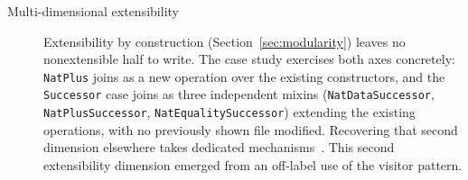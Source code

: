 \begin{CJK*}{UTF8}{gbsn}
\begin{description}
  \item[Multi-dimensional extensibility]\label{item:multi-dimensional-extensibility}
    Extensibility by construction (Section~\ref{sec:modularity}) leaves no
    nonextensible half to write.
    The case study exercises both axes concretely:
    \texttt{NatPlus} joins as a new operation over the
    existing constructors, and the \texttt{Successor} case
    joins as three independent mixins
    (\texttt{NatDataSuccessor},
    \texttt{NatPlusSuccessor},
    \texttt{NatEqualitySuccessor}) extending the existing
    operations, with no previously shown file modified.
    Recovering that second dimension elsewhere takes dedicated
    mechanisms~\cite{liang1995-monad-transformers, lammel2003-scrap-your-boilerplate, loh2006-open-data-types, swierstra2008-data-types-a-la-carte, carette2009-finally-tagless, oliveira2012-object-algebras, kiselyov2013-extensible-effects, wu2014-effect-handlers-in-scope, kiselyov2015-freer-monads, wang2016-expression-problem-trivially, leijen2017-row-typed-algebraic-effects, poulsen2023-hefty-algebras}.
    This second extensibility dimension emerged from an off-label use
    of the visitor pattern.


\end{description}
\end{CJK*}
